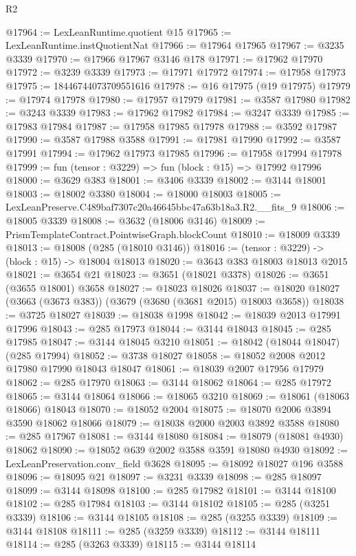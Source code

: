 \begin{lexlean}{R2}
\begin{coremodule}
@17964 := LexLeanRuntime.quotient @15
@17965 := LexLeanRuntime.instQuotientNat
@17966 := @17964 @17965
@17967 := @3235 @3339
@17970 := @17966 @17967 @3146 @178
@17971 := @17962 @17970
@17972 := @3239 @3339
@17973 := @17971 @17972
@17974 := @17958 @17973
@17975 := 18446744073709551616
@17978 := @16 @17975 (@19 @17975)
@17979 := @17974 @17978
@17980 := @17957 @17979
@17981 := @3587 @17980
@17982 := @3243 @3339
@17983 := @17962 @17982
@17984 := @3247 @3339
@17985 := @17983 @17984
@17987 := @17958 @17985 @17978
@17988 := @3592 @17987
@17990 := @3587 @17988 @3588
@17991 := @17981 @17990
@17992 := @3587 @17991
@17994 := @17962 @17973 @17985
@17996 := @17958 @17994 @17978
@17999 := fun (tensor : @3229) => fun (block : @15) => @17992 @17996
@18000 := @3629 @383
@18001 := @3406 @3339
@18002 := @3144 @18001
@18003 := @18002 @3380
@18004 := @18000 @18003
@18005 := LexLeanPreserve.C489baf7307c20a46645bbc47a63b18a3.R2.__fits_9
@18006 := @18005 @3339
@18008 := @3632 (@18006 @3146)
@18009 := PrismTemplateContract.PointwiseGraph.blockCount
@18010 := @18009 @3339
@18013 := @18008 (@285 (@18010 @3146))
@18016 := (tensor : @3229) -> (block : @15) -> @18004 @18013
@18020 := @3643 @383 @18003 @18013 @2015
@18021 := @3654 @21
@18023 := @3651 (@18021 @3378)
@18026 := @3651 (@3655 @18001) @3658
@18027 := @18023 @18026
@18037 := @18020 @18027 (@3663 (@3673 @383)) (@3679 (@3680 (@3681 @2015) @18003 @3658))
@18038 := @3725 @18027
@18039 := @18038 @1998
@18042 := @18039 @2013 @17991 @17996
@18043 := @285 @17973
@18044 := @3144 @18043
@18045 := @285 @17985
@18047 := @3144 @18045 @3210
@18051 := @18042 (@18044 @18047) (@285 @17994)
@18052 := @3738 @18027
@18058 := @18052 @2008 @2012 @17980 @17990 @18043 @18047
@18061 := @18039 @2007 @17956 @17979
@18062 := @285 @17970
@18063 := @3144 @18062
@18064 := @285 @17972
@18065 := @3144 @18064
@18066 := @18065 @3210
@18069 := @18061 (@18063 @18066) @18043
@18070 := @18052 @2004
@18075 := @18070 @2006 @3894 @3590 @18062 @18066
@18079 := @18038 @2000 @2003 @3892 @3588
@18080 := @285 @17967
@18081 := @3144 @18080
@18084 := @18079 (@18081 @4930) @18062
@18090 := @18052 @639 @2002 @3588 @3591 @18080 @4930
@18092 := LexLeanPreservation.conv_field @3628
@18095 := @18092 @18027 @196 @3588
@18096 := @18095 @21
@18097 := @3231 @3339
@18098 := @285 @18097
@18099 := @3144 @18098
@18100 := @285 @17982
@18101 := @3144 @18100
@18102 := @285 @17984
@18103 := @3144 @18102
@18105 := @285 (@3251 @3339)
@18106 := @3144 @18105
@18108 := @285 (@3255 @3339)
@18109 := @3144 @18108
@18111 := @285 (@3259 @3339)
@18112 := @3144 @18111
@18114 := @285 (@3263 @3339)
@18115 := @3144 @18114

\end{coremodule}
\end{lexlean}
